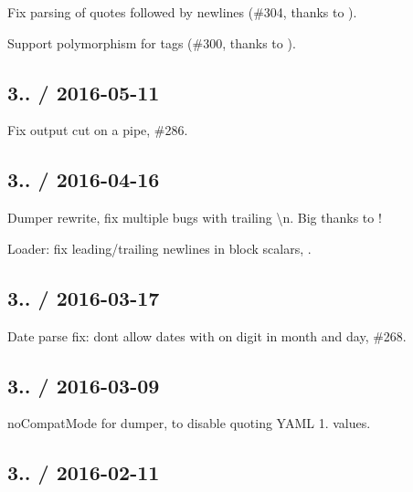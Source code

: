 \begin{DoxyItemize}
\item Fix parsing of quotes followed by newlines (\#304, thanks to ).
\item Support polymorphism for tags (\#300, thanks to ).
\end{DoxyItemize}

\subsection*{3.. / 2016-\/05-\/11 }


\begin{DoxyItemize}
\item Fix output cut on a pipe, \#286.
\end{DoxyItemize}

\subsection*{3.. / 2016-\/04-\/16 }


\begin{DoxyItemize}
\item Dumper rewrite, fix multiple bugs with trailing {\ttfamily \textbackslash{}n}. Big thanks to !
\item Loader\+: fix leading/trailing newlines in block scalars, .
\end{DoxyItemize}

\subsection*{3.. / 2016-\/03-\/17 }


\begin{DoxyItemize}
\item Date parse fix\+: don\textquotesingle{}t allow dates with on digit in month and day, \#268.
\end{DoxyItemize}

\subsection*{3.. / 2016-\/03-\/09 }


\begin{DoxyItemize}
\item {\ttfamily no\+Compat\+Mode} for dumper, to disable quoting Y\+A\+ML 1. values.
\end{DoxyItemize}

\subsection*{3.. / 2016-\/02-\/11 }


